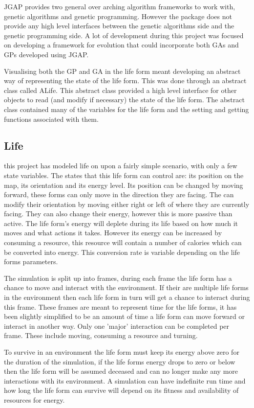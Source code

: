 \documentclass[12pt]{article}
\begin{document}
JGAP provides two general over arching algorithm frameworks to work with, genetic algorithms and genetic programming. However
the package does not provide any high level interfaces between the genetic algorithms side and the genetic programming side. A 
lot of development during this project was focused on developing a framework for evolution that could incorporate both GAs and GPs developed
using JGAP. 

Visualising both the GP and GA in the life form meant developing an abstract way of representing the state of the life form. This was done
through an abstract class called ALife. This abstract class provided a high level interface for other objects to read (and modify if necessary)
the state of the life form. The abstract class contained many of the variables for the life form and the setting and getting functions 
associated with them. 

\subsection{Life}

this project has modeled life on upon a fairly simple scenario, with only a few state variables. The states that this life form
can control are: its position on the map, its orientation and its energy level. Its position can be changed by moving forward, these 
forms can only move in the direction they are facing. The can modify their orientation by moving either right or left of where they 
are currently facing. They can also change their energy, however this is more passive than active. The life form's energy will
deplete during its life based on how much it moves and what actions it takes. However its energy can be increased by consuming a 
resource, this resource will contain a number of calories which can be converted into energy. This conversion rate is variable
depending on the life forms parameters. 

The simulation is split up into frames, during each frame the life form has a chance to move and interact with the environment. If their
are multiple life forms in the environment then each life form in turn will get a chance to interact during this frame. These frames are
meant to represent time for the life forms, it has been slightly simplified to be an amount of time a life form can move forward or interact in another way. Only one 'major' interaction can be completed per frame. These include moving, consuming a resource and turning.

To survive in an environment the life form must keep its energy above zero for the duration of the simulation, if the life forms energy
drops to zero or below then the life form will be assumed deceased and can no longer make any more interactions with its environment. A simulation can have indefinite run time and how long the life form can survive will depend on its fitness and availability of resources for energy.
\end{document}
